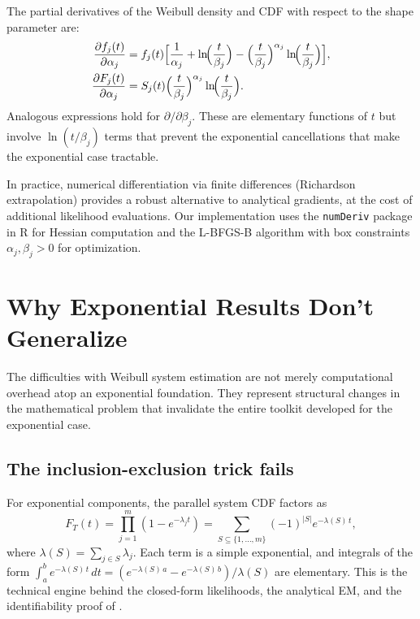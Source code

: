 \documentclass[12pt]{article}
\theoremstyle{definition}
\theoremstyle{remark}
\begin{document}
The partial derivatives of the Weibull density and CDF with respect
to the shape parameter are:
\begin{align}
  \frac{\partial f_j(t)}{\partial \alpha_j}
  &= f_j(t) \Bigl[
    \frac{1}{\alpha_j}
    + \ln\!\Bigl(\frac{t}{\beta_j}\Bigr)
    - \Bigl(\frac{t}{\beta_j}\Bigr)^{\alpha_j}
      \ln\!\Bigl(\frac{t}{\beta_j}\Bigr)
  \Bigr],
  \label{eq:df-dalpha} \\
  \frac{\partial F_j(t)}{\partial \alpha_j}
  &= S_j(t) \Bigl(\frac{t}{\beta_j}\Bigr)^{\alpha_j}
    \ln\!\Bigl(\frac{t}{\beta_j}\Bigr).
  \label{eq:dF-dalpha}
\end{align}
Analogous expressions hold for $\partial / \partial \beta_j$.
These are elementary functions of $t$ but involve $\ln(t/\beta_j)$
terms that prevent the exponential cancellations that make the
exponential case tractable.

In practice, numerical differentiation via finite differences
(Richardson extrapolation) provides a robust alternative to
analytical gradients, at the cost of additional likelihood
evaluations.  Our implementation uses the \texttt{numDeriv} package
in R for Hessian computation and the L-BFGS-B algorithm
\citep{ByrdLuNocedal1995} with box constraints
$\alpha_j, \beta_j > 0$ for optimization.


\section{Why Exponential Results Don't Generalize}
\label{sec:why-hard}

The difficulties with Weibull system estimation are not merely
computational overhead atop an exponential foundation.  They
represent structural changes in the mathematical problem that
invalidate the entire toolkit developed for the exponential case.

\subsection{The inclusion-exclusion trick fails}

For exponential components, the parallel system CDF factors as
\begin{equation}\label{eq:exp-cdf-ie}
  F_T(t) = \prod_{j=1}^m (1 - e^{-\lambda_j t})
  = \sum_{S \subseteq \{1,\ldots,m\}} (-1)^{|S|}
    e^{-\lambda(S)\, t},
\end{equation}
where $\lambda(S) = \sum_{j \in S} \lambda_j$.  Each term is a
simple exponential, and integrals of the form
$\int_a^b e^{-\lambda(S)\, t}\, dt = (e^{-\lambda(S)\, a} -
e^{-\lambda(S)\, b}) / \lambda(S)$ are elementary.  This is the
technical engine behind the closed-form likelihoods, the
analytical EM, and the identifiability proof of \citet{Towell2026}.
\end{document}
